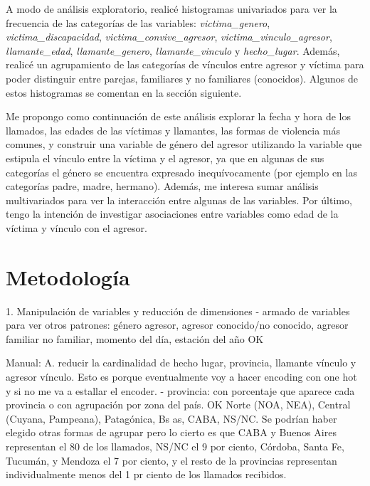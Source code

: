 \documentclass[10pt, spanish]{article}
\begin{document}
A modo de análisis exploratorio, realicé histogramas univariados para ver la frecuencia de las categorías de las variables: \textit{victima\_genero}, \textit{victima\_discapacidad}, \textit{victima\_convive\_agresor}, \textit{victima\_vinculo\_agresor}, \textit{llamante\_edad}, \textit{llamante\_genero}, \textit{llamante\_vinculo} y \textit{hecho\_lugar}. Además, realicé un agrupamiento de las categorías de vínculos entre agresor y víctima para poder distinguir entre parejas, familiares y no familiares (conocidos). Algunos de estos histogramas se comentan en la sección siguiente. 

Me propongo como continuación de este análisis explorar la fecha y hora de los llamados, las edades de las víctimas y llamantes, las formas de violencia más comunes, y construir una variable de género del agresor utilizando la variable que estipula el vínculo entre la víctima y el agresor, ya que en algunas de sus categorías el género se encuentra expresado inequívocamente (por ejemplo en las categorías padre, madre, hermano). Además, me interesa sumar análisis multivariados para ver la interacción entre algunas de las variables. Por último, tengo la intención de investigar asociaciones entre variables como edad de la víctima y vínculo con el agresor.


\section{Metodología}\label{met}


1. Manipulación de variables y reducción de dimensiones
- armado de variables para ver otros patrones: género agresor, agresor conocido/no conocido, agresor familiar no familiar, momento del día, estación del año OK

Manual:
A. reducir la cardinalidad de hecho lugar, provincia, llamante vínculo y agresor vínculo. Esto es porque eventualmente
voy a hacer encoding con one hot y si no me va a estallar el encoder.
- provincia: con porcentaje que aparece cada provincia o con agrupación por zona del país. OK
Norte (NOA, NEA), Central (Cuyana, Pampeana), Patagónica, Bs as, CABA, NS/NC. Se podrían haber elegido otras formas de agrupar pero lo cierto es que CABA y Buenos Aires representan el 80 de los llamados, NS/NC el 9 por ciento, Córdoba, Santa Fe, Tucumán, y Mendoza el 7 por ciento, y el resto de la provincias representan individualmente menos del 1 pr ciento de los llamados recibidos.
\end{document}
